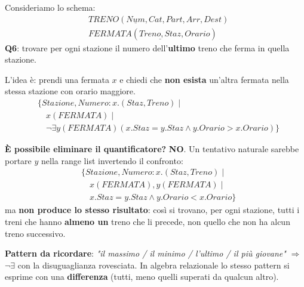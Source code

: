 \documentclass[a4paper,twoside]{article}
\begin{document}
\begin{example}
  Consideriamo lo schema:
  \[
    \begin{aligned}
      &TRENO(\underline{Num}, Cat, Part, Arr, Dest)\\
      &FERMATA(\underline{Treno, Staz}, Orario)
    \end{aligned}
  \]
  \textbf{Q6}: trovare per ogni stazione il numero dell'\textbf{ultimo} treno che ferma
  in quella stazione.

  \vspace{1em}
  \noindent
  L'idea è: prendi una fermata \( x \) e chiedi che \textbf{non esista} un'altra fermata
  nella stessa stazione con orario maggiore.
  \[
    \begin{aligned}
      &\{ Stazione, Numero: x.(Staz, Treno) \mid \\
      &\quad x(FERMATA) \mid \\
      &\quad \lnot \exists y(FERMATA)(x.Staz = y.Staz \land y.Orario > x.Orario)
      \}
    \end{aligned}
  \]

  \vspace{1em}
  \noindent
  \textbf{È possibile eliminare il quantificatore?} \textbf{NO}. Un tentativo naturale
  sarebbe portare \( y \) nella range list invertendo il confronto:
  \[
    \begin{aligned}
      &\{ Stazione, Numero: x.(Staz, Treno) \mid \\
      &\quad x(FERMATA), y(FERMATA) \mid \\
      &\quad x.Staz = y.Staz \land y.Orario < x.Orario
      \}
    \end{aligned}
  \]
  ma \textbf{non produce lo stesso risultato}: così si trovano, per ogni stazione, tutti
  i treni che hanno \textbf{almeno un} treno che li precede, non quello che non ha alcun
  treno successivo.

  \vspace{1em}
  \noindent
  \textbf{Pattern da ricordare}: \textit{"il massimo / il minimo / l'ultimo / il più
  giovane"} \( \Rightarrow \) \( \lnot \exists \) con la disuguaglianza rovesciata.
  In algebra relazionale lo stesso pattern si esprime con una \textbf{differenza}
  (tutti, meno quelli superati da qualcun altro).
\end{example}
\end{document}
